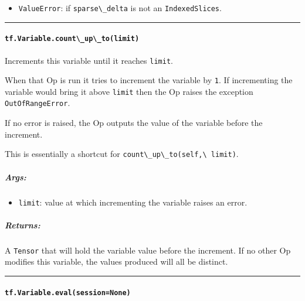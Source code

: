 \begin{itemize}
\tightlist
\item
  \lstinline{ValueError}: if \lstinline{sparse\_delta} is not an
  \lstinline{IndexedSlices}.
\end{itemize}

\begin{center}\rule{0.5\linewidth}{\linethickness}\end{center}

\paragraph{\texorpdfstring{\lstinline{tf.Variable.count\_up\_to(limit)}
}{tf.Variable.count\_up\_to(limit) }}\label{tf.variable.countux5fupux5ftolimit}

Increments this variable until it reaches \lstinline{limit}.

When that Op is run it tries to increment the variable by \lstinline{1}. If
incrementing the variable would bring it above \lstinline{limit} then the
Op raises the exception \lstinline{OutOfRangeError}.

If no error is raised, the Op outputs the value of the variable before
the increment.

This is essentially a shortcut for \lstinline{count\_up\_to(self,\ limit)}.

\subparagraph{Args: }\label{args-5}

\begin{itemize}
\tightlist
\item
  \lstinline{limit}: value at which incrementing the variable raises an
  error.
\end{itemize}

\subparagraph{Returns: }\label{returns-6}

A \lstinline{Tensor} that will hold the variable value before the
increment. If no other Op modifies this variable, the values produced
will all be distinct.

\begin{center}\rule{0.5\linewidth}{\linethickness}\end{center}

\paragraph{\texorpdfstring{\lstinline{tf.Variable.eval(session=None)}
}{tf.Variable.eval(session=None) }}\label{tf.variable.evalsessionnone}

